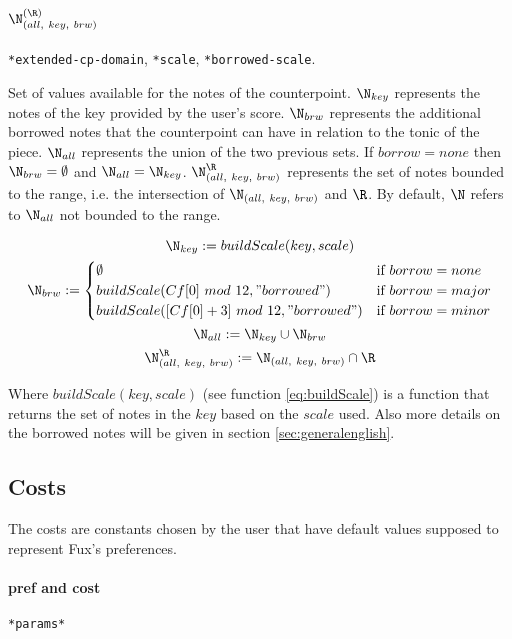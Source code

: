 \paragraph{$\N_{(all,\ key,\ brw)}^{(\R)}$} \texttt{*extended-cp-domain}, \texttt{*scale}, \texttt{*borrowed-scale}.

Set of values available for the notes of the counterpoint. $\N_{key}$ represents the notes of the key provided by the user's score. $\N_{brw}$ represents the additional borrowed notes that the counterpoint can have in relation to the tonic of the piece. $\N_{all}$ represents the union of the two previous sets. If $borrow = none$ then $\N_{brw} = \emptyset$ and $\N_{all} = \N_{key}$. $\N_{(all,\ key,\ brw)}^{\R}$ represents the set of notes bounded to the range, i.e. the intersection of $\N_{(all,\ key,\ brw)}$ and $\R$. By default, $\N$ refers to $\N_{all}$ not bounded to the range.

\begin{equation}
    \begin{gathered}
        \N_{key} := buildScale(key, scale)\\
        \N_{brw} := \begin{cases}
            \emptyset & \text{if } borrow = none\\
            buildScale(Cf[0]\ mod\ 12, "borrowed") & \text{if } borrow = major\\
            buildScale([Cf[0]+3]\ mod\ 12, "borrowed") & \text{if } borrow = minor
        \end{cases}\\
        \N_{all} := \N_{key} \cup \N_{brw}\\
        \N_{(all,\ key,\ brw)}^{\R} := \N_{(all,\ key,\ brw)} \cap \R\\
    \end{gathered}
\end{equation}

Where $buildScale(key, scale)$ (see function \ref{eq:buildScale}) is a function that returns the set of notes in the $key$ based on the $scale$ used. Also more details on the borrowed notes will be given in section \ref{sec:generalenglish}.

\subsection{Costs}
The costs are constants chosen by the user that have default values supposed to represent Fux's preferences.

\paragraph{pref and cost} \texttt{*params*}

